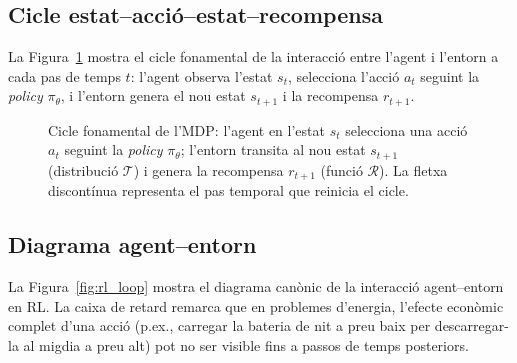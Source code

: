 \documentclass[a4paper,12pt,twoside]{ThesisStyle}
\begin{document}
\subsection{Cicle estat--acció--estat--recompensa}

La Figura~\ref{fig:mdp_loop} mostra el cicle fonamental de la interacció entre l'agent i l'entorn a cada pas de temps $t$: l'agent observa l'estat $s_t$, selecciona l'acció $a_t$ seguint la \textit{policy} $\pi_\theta$, i l'entorn genera el nou estat $s_{t+1}$ i la recompensa $r_{t+1}$.

\begin{figure}[htb]
\centering
{}
\caption{Cicle fonamental de l'MDP: l'agent en l'estat $s_t$ selecciona una acció $a_t$ seguint la \textit{policy} $\pi_\theta$; l'entorn transita al nou estat $s_{t+1}$ (distribució $\mathcal{T}$) i genera la recompensa $r_{t+1}$ (funció $\mathcal{R}$). La fletxa discontínua representa el pas temporal que reinicia el cicle.}
\label{fig:mdp_loop}
\end{figure}

\subsection{Diagrama agent--entorn}

La Figura~\ref{fig:rl_loop} mostra el diagrama canònic de la interacció agent--entorn en RL. La caixa de retard remarca que en problemes d'energia, l'efecte econòmic complet d'una acció (p.ex., carregar la bateria de nit a preu baix per descarregar-la al migdia a preu alt) pot no ser visible fins a passos de temps posteriors.
\end{document}
